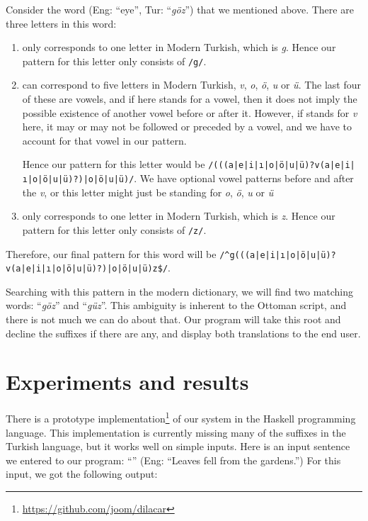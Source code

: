 \documentclass[10pt,twocolumn]{article}
\theoremstyle{nonumberplain}
\newcommand{\otto}[1]{\RLE{\ottoman{}\Large{}#1}}
\newcommand{\word}[1]{``\emph{#1}''}
\begin{document}
Consider the word \otto{گوز} (Eng: ``eye'', Tur: \word{göz}) that we mentioned above.
There are three letters in this word: %
\begin{enumerate}[noitemsep,topsep=0pt]
  \item \otto{گ} only corresponds to one letter in Modern Turkish, which is
    \emph{g}. Hence our pattern for this letter only consists of \texttt{/g/}.
  \item \otto{و} can correspond to five letters in Modern Turkish, \emph{v},
    \emph{o}, \emph{ö}, \emph{u} or \emph{ü}. The last four of these are
    vowels, and if \otto{و} here stands for a vowel, then it does not imply the
    possible existence of another vowel before or after it. However, if
    \otto{و} stands for \emph{v} here, it may or may not be followed or
    preceded by a vowel, and we have to account for that vowel in our pattern.

    Hence our pattern for this letter would be
    \texttt{/(((a|e|i|ı|o|ö|u|ü)?v(a|e|i|ı|o|ö|u|ü)?)|o|ö|u|ü)/}.
    We have optional vowel patterns before and after the \emph{v}, or this
    letter might just be standing for \emph{o}, \emph{ö}, \emph{u} or \emph{ü}
\item \otto{ز} only corresponds to one letter in Modern Turkish, which is
    \emph{z}. Hence our pattern for this letter only consists of \texttt{/z/}.
\end{enumerate}

Therefore, our final pattern for this word will be
\texttt{/\^{}g(((a|e|i|ı|o|ö|u|ü)?v(a|e|i|ı|o|ö|u|ü)?)|o|ö|u|ü)z\$/}.

Searching with this pattern in the modern dictionary, we will find two matching
words: \word{göz} and \word{güz}. This ambiguity is inherent to the Ottoman
script, and there is not much we can do about that. Our program will take this
root and decline the suffixes if there are any, and display both translations
to the end user.

\section{Experiments and results}

There is a prototype
implementation\footnote{\url{https://github.com/joom/dilacar}} of our system in
the Haskell programming language. This implementation is currently missing many
of the suffixes in the Turkish language, but it works well on simple inputs.
Here is an input sentence we entered to our program:
 ``\otto{ياپراقلر باخچه‌لردن دوشمش.}'' (Eng: ``Leaves fell from the gardens.'')
For this input, we got the following output:
\end{document}
